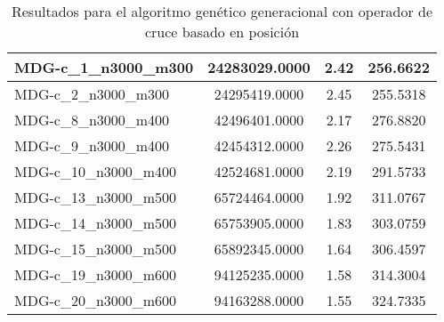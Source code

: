 \documentclass[10pt,a4paper]{article}
\begin{document}
\begin{table}[H]
\begin{center}
\begin{tabular}{|l|c|c|c|}
		MDG-c\_1\_n3000\_m300 & 24283029.0000 & 2.42 & 256.6622 \\ \hline
		MDG-c\_2\_n3000\_m300 & 24295419.0000 & 2.45 & 255.5318 \\ \hline
		MDG-c\_8\_n3000\_m400 & 42496401.0000 & 2.17 & 276.8820 \\ \hline
		MDG-c\_9\_n3000\_m400 & 42454312.0000 & 2.26 & 275.5431 \\ \hline
		MDG-c\_10\_n3000\_m400 & 42524681.0000 & 2.19 & 291.5733 \\ \hline
		MDG-c\_13\_n3000\_m500 & 65724464.0000 & 1.92 & 311.0767 \\ \hline
		MDG-c\_14\_n3000\_m500 & 65753905.0000 & 1.83 & 303.0759 \\ \hline
		MDG-c\_15\_n3000\_m500 & 65892345.0000 & 1.64 & 306.4597 \\ \hline
		MDG-c\_19\_n3000\_m600 & 94125235.0000 & 1.58 & 314.3004 \\ \hline
		MDG-c\_20\_n3000\_m600 & 94163288.0000 & 1.55 & 324.7335 \\ \hline
	\end{tabular}
	\caption{Resultados para el algoritmo genético generacional con operador de cruce basado en posición}
	\label{}
	\end{center}
\end{table}

\newpage
\end{document}
